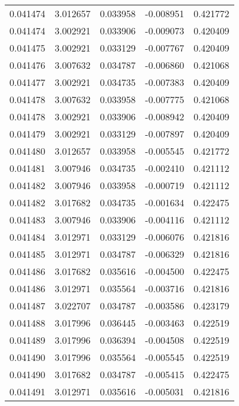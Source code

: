 \begin{tabular}{lrrrr}
0.041474    &  3.012657 &  0.033958 & -0.008951 &             0.421772 \\
0.041474    &  3.002921 &  0.033906 & -0.009073 &             0.420409 \\
0.041475    &  3.002921 &  0.033129 & -0.007767 &             0.420409 \\
0.041476    &  3.007632 &  0.034787 & -0.006860 &             0.421068 \\
0.041477    &  3.002921 &  0.034735 & -0.007383 &             0.420409 \\
0.041478    &  3.007632 &  0.033958 & -0.007775 &             0.421068 \\
0.041478    &  3.002921 &  0.033906 & -0.008942 &             0.420409 \\
0.041479    &  3.002921 &  0.033129 & -0.007897 &             0.420409 \\
0.041480    &  3.012657 &  0.033958 & -0.005545 &             0.421772 \\
0.041481    &  3.007946 &  0.034735 & -0.002410 &             0.421112 \\
0.041482    &  3.007946 &  0.033958 & -0.000719 &             0.421112 \\
0.041482    &  3.017682 &  0.034735 & -0.001634 &             0.422475 \\
0.041483    &  3.007946 &  0.033906 & -0.004116 &             0.421112 \\
0.041484    &  3.012971 &  0.033129 & -0.006076 &             0.421816 \\
0.041485    &  3.012971 &  0.034787 & -0.006329 &             0.421816 \\
0.041486    &  3.017682 &  0.035616 & -0.004500 &             0.422475 \\
0.041486    &  3.012971 &  0.035564 & -0.003716 &             0.421816 \\
0.041487    &  3.022707 &  0.034787 & -0.003586 &             0.423179 \\
0.041488    &  3.017996 &  0.036445 & -0.003463 &             0.422519 \\
0.041489    &  3.017996 &  0.036394 & -0.004508 &             0.422519 \\
0.041490    &  3.017996 &  0.035564 & -0.005545 &             0.422519 \\
0.041490    &  3.017682 &  0.034787 & -0.005415 &             0.422475 \\
0.041491    &  3.012971 &  0.035616 & -0.005031 &             0.421816 \\

\end{tabular}
